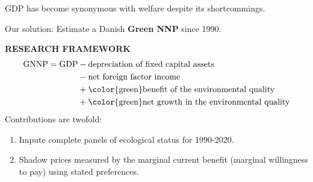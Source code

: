 \begin{frame}
  GDP has become synonymous with welfare despite its shortcommings.\par
  Our solution: Estimate a Danish \textbf{Green NNP} since 1990.
  \begin{tcolorbox}
    \textbf{RESEARCH FRAMEWORK}
    \begin{align*}
        \text{GNNP} = \text{GDP} &- \text{depreciation of fixed capital assets} \\
        &- \text{net foreign factor income} \\
        &+ \text{\color{green}benefit of the environmental quality} \\
        &+ \text{\color{green}net growth in the environmental quality}
    \end{align*}
    Contributions are twofold:
    \begin{enumerate}
      \item Impute complete panels of ecological status for 1990-2020.
      \item Shadow prices measured by the marginal current benefit (marginal willingness to pay) using stated preferences.
    \end{enumerate}
  \end{tcolorbox}
  \vfill
\end{frame}
